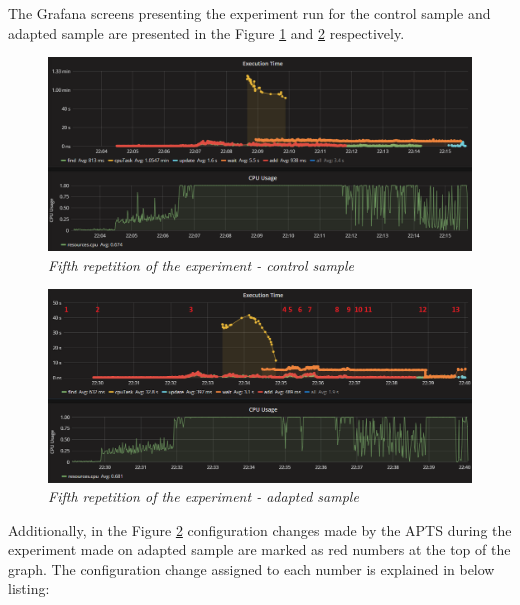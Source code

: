 \documentclass[12pt,a4paper]{article}
\begin{document}
The Grafana screens presenting the experiment run for the control sample and adapted sample are presented in the Figure \ref{figure:random:screen:control:5} and \ref{figure:random:screen:adapted:5} respectively. 

\begin{figure}[!htb]
\centering
\includegraphics[width=1\textwidth]{5-ctrl}
\caption{\textit{Fifth repetition of the experiment - control sample}} \label{figure:random:screen:control:5}
\end{figure}

\begin{figure}[!htb]
\centering
\includegraphics[width=1\textwidth]{5-adap}
\caption{\textit{Fifth repetition of the experiment - adapted sample}} \label{figure:random:screen:adapted:5}
\end{figure}

Additionally, in the Figure \ref{figure:random:screen:adapted:5} configuration changes made by the APTS during the experiment made on adapted sample are marked as red numbers at the top of the graph. The configuration change assigned to each number is explained in below listing: 
\end{document}
